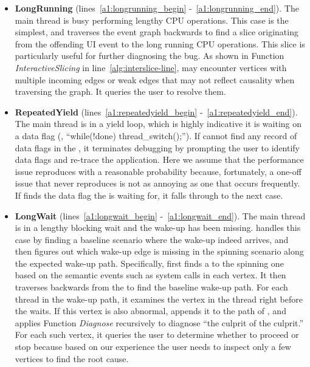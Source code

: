 \begin{itemize}
	\item \textbf{LongRunning} (lines~\ref{a1:longrunning_begin}
		-~\ref{a1:longrunning_end}). The main thread is busy performing lengthy
		CPU operations. This case is the simplest, and \xxx traverses the event
		graph backwards to find a slice originating from the offending UI event
		to the long running CPU operations. This slice is particularly useful for
		further diagnosing the bug. As shown in Function \textit{InteractiveSlicing} in
		line~\ref{alg:interslice-line}, \xxx may encounter vertices with multiple
		incoming edges or weak edges that may not reflect causality when traversing
		the graph. It queries the user to resolve them.

	\item \textbf{RepeatedYield} (lines~\ref{a1:repeatedyield_begin}
		-~\ref{a1:repeatedyield_end}). The main thread is in a yield loop, which
		is highly indicative it is waiting on a data flag (\eg, ``while(!done)
		thread\_switch();''). If \xxx cannot find any record of data flags in the
		\spinningnode, it terminates debugging by prompting the user to identify data
		flags and re-trace the application. Here we assume that the performance issue
		reproduces with a reasonable probability because, fortunately, a one-off issue
		that never reproduces is not as annoying as one that occurs frequently. If
		\xxx finds the data flag the \spinningnode is waiting for, it falls through to
		the next case.

	\item \textbf{LongWait} (lines~\ref{a1:longwait_begin}
		-~\ref{a1:longwait_end}). The main thread is in a lengthy blocking wait and
		the wake-up has been missing. \xxx handles this case by finding a baseline
		scenario where the wake-up indeed arrives, and then figures out which wake-up
		edge is missing in the spinning scenario along the expected wake-up path.
		Specifically, \xxx first finds a \similarnode to the spinning one based %
		on the semantic events such as system calls in each vertex. It then traverses
		backwards from the \similarnode to find the baseline wake-up path. For each
		thread in the wake-up path, it examines the vertex in the thread right before
		the \spinningnode waits. If this vertex is also abnormal, \xxx appends it
		to the path of \rootcausenodes, and applies Function \textit{Diagnose} recursively
		to diagnose ``the culprit of the culprit.'' For each such vertex, it queries the
		user to determine whether to proceed or stop because based on our experience
		the user needs to inspect only a few vertices to find the root cause.

\end{itemize}
